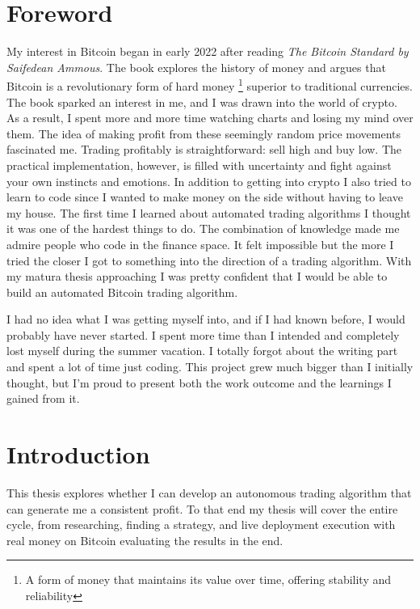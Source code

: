 \documentclass[12pt]{article}
\begin{document}
\section*{Foreword}
My interest in Bitcoin began in early 2022 after reading \textit{The Bitcoin Standard by Saifedean Ammous}. The book explores the history of money and argues that Bitcoin is a revolutionary form of hard money \footnote{A form of money that maintains its value over time, offering stability and reliability} superior to traditional currencies. The book sparked an interest in me, and I was drawn into the world of crypto. As a result, I spent more and more time watching charts and losing my mind over them. The idea of making profit from these seemingly random price movements fascinated me.
Trading profitably is straightforward: sell high and buy low. The practical implementation, however, is filled with uncertainty and  fight against your own instincts and emotions.
In addition to getting into crypto I also tried to learn to code since I wanted to make money on the side without having to leave my house. The first time I learned about automated trading algorithms I thought it was one of the hardest things to do. The combination of knowledge made me admire people who code in the finance space. It felt impossible but the more I tried the closer I got to something into the direction of a trading algorithm. With my matura thesis approaching I was pretty confident that I would be able to build an automated Bitcoin trading algorithm. 






I had no idea what I was getting myself into, and if I had known before, I would probably have never started. I spent more time than I intended and completely lost myself during the summer vacation. I totally forgot about the writing part and spent a lot of time just coding. This project grew much bigger than I initially thought, but I'm proud to present both the work outcome and the learnings I gained from it.





\clearpage

\tableofcontents
\clearpage

\setcounter{page}{1}
\section{Introduction}
This thesis explores whether I can develop an autonomous trading algorithm that can generate me a consistent profit. To that end my thesis will cover the entire cycle, from researching, finding a strategy, and live deployment execution with real money on Bitcoin evaluating the results in the end.
\end{document}
